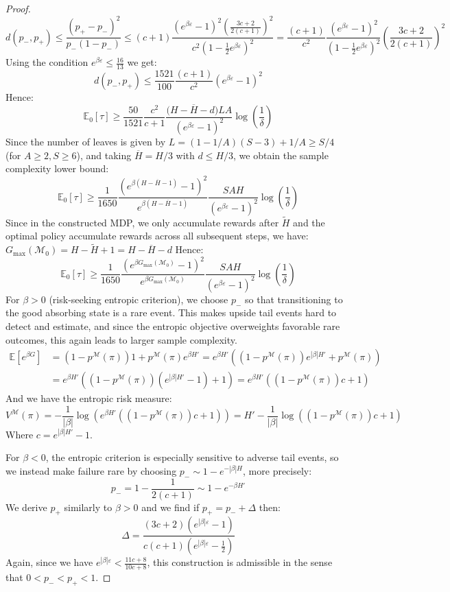 \documentclass[final,12pt]{colt2026} %
\begin{document}
\begin{proof}
$$d(p_-, p_+) \leq \frac{(p_+ - p_-)^2}{p_-(1 - p_-)} \leq (c+1)  \frac{(e^{\beta \varepsilon} - 1)^2 \left(\frac{3c+2}{2(c+1)}\right)^2}{c^2(1 - \frac{1}{2}e^{\beta \varepsilon})^2} = \frac{(c+1)}{c^2}  \frac{(e^{\beta \varepsilon} - 1)^2}{(1 - \frac{1}{2}e^{\beta \varepsilon})^2}  \left(\frac{3c+2}{2(c+1)}\right)^2$$
Using the condition $e^{\beta \varepsilon} \leq \frac{16}{13}$ we get:
$$d(p_-,p_+) \leq \frac{1521}{100} \frac{(c+1)}{c^2} (e^{\beta \varepsilon} - 1)^2$$
Hence:
$$\mathbb{E}_0[\tau] \geq \frac{50}{1521} \frac{c^2}{c+1} \frac{\big( H - \overline{H}-d\big) L A}{(e^{\beta \varepsilon} - 1)^2} \log\left(\frac{1}{\delta}\right)$$
Since the number of leaves is given by $L = (1 - 1/A)(S - 3) + 1/A \geq S/4$ (for $A \geq 2, S \geq 6$), and taking $\overline{H} = H/3$ with $d \leq H/3$, we obtain the sample complexity lower bound:
$$\mathbb{E}_0[\tau] \geq \frac{1}{1650} \frac{\left(e^{\beta (H - \overline{H} -1)}- 1\right)^2}{e^{\beta (H - \overline{H} -1)}} \frac{SAH}{(e^{\beta \varepsilon} - 1)^2} \log\left(\frac{1}{\delta}\right)$$
Since in the constructed MDP, we only accumulate rewards after $\tilde H$ and the optimal policy accumulate rewards across all subsequent steps, we have: $G_{\max}(\mathcal{M}_0) = H - \tilde{H} + 1 = H - \overline{H} -d $ Hence:
$$\mathbb{E}_0[\tau] \geq \frac{1}{1650} \frac{\left(e^{\beta G_{\max}(\mathcal{M}_0)}- 1\right)^2}{e^{\beta G_{\max}(\mathcal{M}_0)}} \frac{SAH}{(e^{\beta \varepsilon} - 1)^2} \log\left(\frac{1}{\delta}\right)$$
For $\beta>0$ (risk-seeking entropic criterion), we choose $p_-$ so that transitioning to the good absorbing state is a rare event. This makes upside tail events hard
to detect and estimate, and since the entropic objective overweights favorable rare outcomes, this
again leads to larger sample complexity.\begin{align*}
\mathbb{E}[e^{\beta G}] &= (1 - p^\mathcal{M}(\pi))  1 + p^\mathcal{M}(\pi)  e^{\beta H'} = e^{\beta H'} \left( (1 - p^\mathcal{M}(\pi)) e^{|\beta | H'} + p^\mathcal{M}(\pi) \right) \\&=  e^{\beta H'} \left( (1 - p^\mathcal{M}(\pi)) (e^{|\beta | H'} -1)  + 1 \right) = e^{\beta H'} \left( (1 - p^\mathcal{M}(\pi))c  + 1 \right)
\end{align*}
And we have the entropic risk measure:
$$V^{\mathcal{M}}(\pi) = -\frac{1}{|\beta|} \log\left(e^{\beta H'} \left( (1 - p^\mathcal{M}(\pi))c  + 1 \right)\right) = H' - \frac{1}{|\beta|} \log\left((1 - p^\mathcal{M}(\pi))c  + 1 \right)$$
Where $c = e^{|\beta | H'} -1$.

For $\beta<0$, the entropic criterion is especially sensitive to adverse tail events, so we instead make failure rare by choosing $p_- \sim 1 - e^{-|\beta|H}$, more precisely:
$$p_- = 1 - \frac{1}{2(c+1)} \sim 1 - e^{-\beta H'}$$
We derive $p_+$ similarly to $\beta > 0$ and we find if $p_+ = p_- + \Delta$ then:
$$\Delta = \frac{(3c + 2)(e^{|\beta| \varepsilon} - 1)}{c(c + 1)(e^{|\beta| \varepsilon} -\frac{1}{2})}$$
Again, since we have $e^{|\beta|\varepsilon} < \frac{11c + 8}{10c + 8}$, this construction is admissible in the sense that $0 <p_- <p_+ <1$.


\end{proof}
\end{document}
